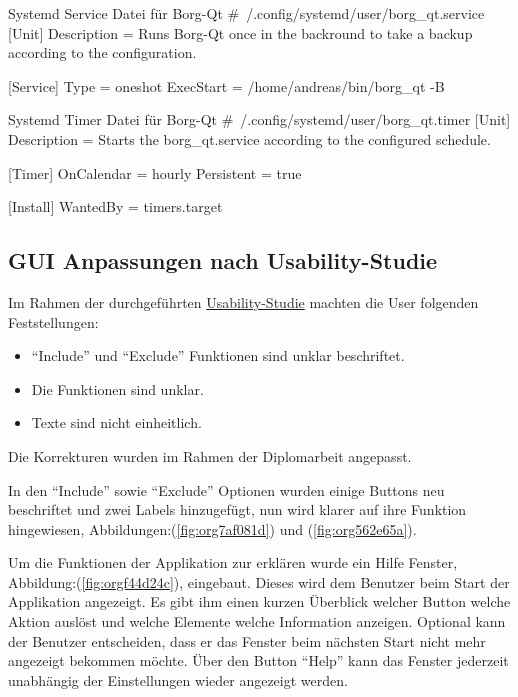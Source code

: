 \begin{sexylisting}[label=org686435b]{Systemd Service Datei für Borg-Qt}
#~/.config/systemd/user/borg_qt.service
[Unit]
Description = Runs Borg-Qt once in the backround to take a backup according to the configuration.

[Service]
Type = oneshot
ExecStart = /home/andreas/bin/borg_qt -B
\end{sexylisting}

\begin{sexylisting}[label=orgc9b6ece]{Systemd Timer Datei für Borg-Qt}
#~/.config/systemd/user/borg_qt.timer
[Unit]
Description = Starts the borg_qt.service according to the configured schedule.

[Timer]
OnCalendar = hourly
Persistent = true

[Install]
WantedBy = timers.target
\end{sexylisting}
\newpage
\subsection{GUI Anpassungen nach Usability-Studie}
\label{sec:org7b2251d}

Im Rahmen der durchgeführten \hyperref[sec:org4a36f83]{Usability-Studie} machten die User folgenden
Feststellungen:
\begin{itemize}
\item "`Include"' und "`Exclude"' Funktionen sind unklar beschriftet.
\item Die Funktionen sind unklar.
\item Texte sind nicht einheitlich.
\end{itemize}

Die Korrekturen wurden im Rahmen der Diplomarbeit angepasst.

In den "`Include"' sowie "`Exclude"' Optionen wurden einige Buttons neu beschriftet
und zwei Labels hinzugefügt, nun wird klarer auf ihre Funktion hingewiesen,
Abbildungen:(\ref{fig:org7af081d}) und
(\ref{fig:org562e65a}).

Um die Funktionen der Applikation zur erklären wurde ein Hilfe Fenster,
Abbildung:(\ref{fig:orgf44d24c}), eingebaut. Dieses wird dem Benutzer beim Start der
Applikation angezeigt. Es gibt ihm einen kurzen Überblick welcher Button welche
Aktion auslöst und welche Elemente welche Information anzeigen. Optional kann
der Benutzer entscheiden, dass er das Fenster beim nächsten Start nicht mehr
angezeigt bekommen möchte. Über den Button "`Help"' kann das Fenster jederzeit
unabhängig der Einstellungen wieder angezeigt werden.

